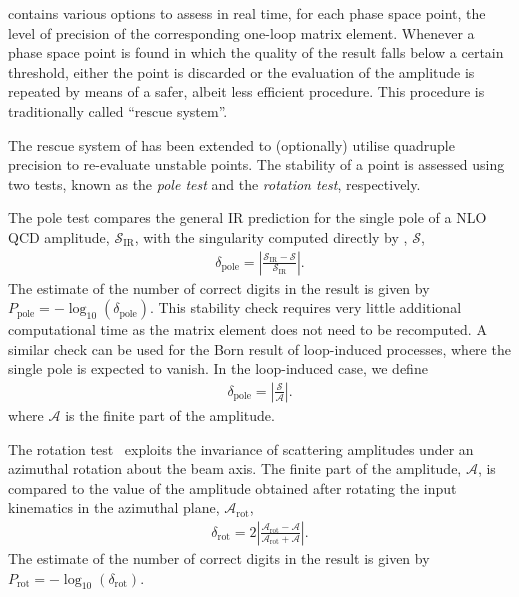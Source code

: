 \gosam{} contains various options to assess in real time, for each phase space point, 
the level of precision of the corresponding one-loop matrix element. 
Whenever a phase space point is found in which the quality of the result falls below a
certain threshold, either the point is discarded or the evaluation of the amplitude is
repeated by means of a safer, albeit less efficient procedure. This procedure is
traditionally called ``rescue system''.

The rescue system of  has been extended to (optionally) utilise quadruple precision to re-evaluate unstable points. The stability of a point is assessed using two tests, known as the \textit{pole test} and the \textit{rotation test}, respectively.

The pole test compares the general IR prediction for the single pole of a NLO QCD amplitude, $\mathcal{S}_\mathrm{IR}$, with the singularity computed directly by \gosam, $\mathcal{S}$,
\begin{align}
\delta_\mathrm{pole} = \left| \frac{\mathcal{S}_\mathrm{IR} - \mathcal{S}}{{\mathcal{S}_\mathrm{IR}}} \right|.
\end{align}
The estimate of the number of correct digits in the result is given by $P_\mathrm{pole} = - \log_{10} ( \delta_\mathrm{pole})$.
This stability check requires very little additional computational time as the matrix element does not need to be recomputed.
A similar check can be used for the Born result of loop-induced processes, where the single pole is expected to vanish.
In the loop-induced case, we define
\begin{align}
\delta_\mathrm{pole} = \left| \frac{\mathcal{S}}{\mathcal{A}} \right|.
\end{align}
where $\mathcal{A}$ is the finite part of the amplitude.

The rotation test~\cite{vanDeurzen:2013saa} exploits the invariance of scattering amplitudes under an azimuthal rotation about the beam axis.
The finite part of the amplitude, $\mathcal{A}$, is compared to the value of the amplitude obtained after rotating the input kinematics in the azimuthal plane, $\mathcal{A}_\mathrm{rot}$,
\begin{align}
\delta_\mathrm{rot} = 2 \left| \frac{\mathcal{A}_\mathrm{rot}-\mathcal{A}}{\mathcal{A}_\mathrm{rot}+\mathcal{A}} \right|.
\end{align}
The estimate of the number of correct digits in the result is given by $P_\mathrm{rot} = - \log_{10} ( \delta_\mathrm{rot})$.

